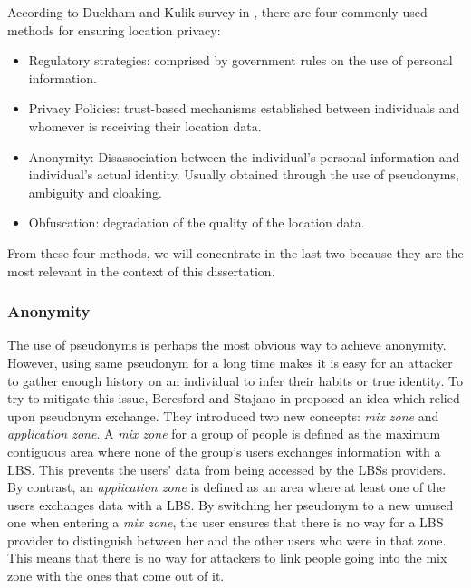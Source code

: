According to Duckham and Kulik survey in \cite{duckham2006location},
there are four commonly used methods for ensuring location privacy:
\begin{itemize}
\item Regulatory strategies: comprised by government rules on the use
  of personal information.
\item Privacy Policies: trust-based mechanisms established
  between individuals and whomever is receiving their location data.
\item Anonymity: Disassociation between the individual's personal
  information and individual's actual identity. Usually obtained
  through the use of pseudonyms, ambiguity and cloaking.
\item Obfuscation: degradation of the quality of the location data.
\end{itemize}

From these four methods, we will concentrate in the last two because
they are the most relevant in the context of this dissertation.

\subsubsection{Anonymity}
\label{sec:privacy_anonimity}

The use of pseudonyms is perhaps the most obvious way to achieve
anonymity. However, using same pseudonym for a long time makes it is
easy for an attacker to gather enough history on an individual to
infer their habits or true identity. To try to mitigate this issue,
Beresford and Stajano in \cite{1186725} proposed an idea which relied
upon pseudonym exchange. They introduced two new concepts: \emph{mix
  zone} and \emph{application zone}. A \emph{mix zone} for a group of
people is defined as the maximum contiguous area where none of the
group's users exchanges information with a LBS. This prevents the
users' data from being accessed by the LBSs providers. By contrast, an
\emph{application zone} is defined as an area where at least one of
the users exchanges data with a LBS. By switching her pseudonym to a
new unused one when entering a \emph{mix zone}, the user ensures that
there is no way for a LBS provider to distinguish between her and the
other users who were in that zone. This means that there is no way for
attackers to link people going into the mix zone with the ones that
come out of it.

